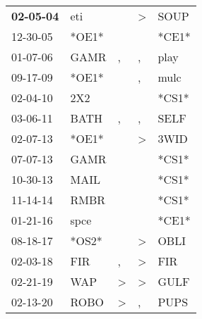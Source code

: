 \begin{supertabular}{p{0.07\textwidth}p{0.06\textwidth}p{0.02\textwidth}p{0.02\textwidth}p{0.06\textwidth}}
 \textbf{02-05-04\textsuperscript{}} &   eti\textsuperscript{} &               &  \textgreater &  SOUP\textsuperscript{} \\
          12-30-05\textsuperscript{} &                   *OE1* &               &               &                   *CE1* \\
          01-07-06\textsuperscript{} &  GAMR\textsuperscript{} &             , &             , &  play\textsuperscript{} \\
          09-17-09\textsuperscript{} &                   *OE1* &               &             , &  mulc\textsuperscript{} \\
          02-04-10\textsuperscript{} &   2X2\textsuperscript{} &               &               &                   *CS1* \\
          03-06-11\textsuperscript{} &  BATH\textsuperscript{} &             , &             , &  SELF\textsuperscript{} \\
          02-07-13\textsuperscript{} &                   *OE1* &               &  \textgreater &  3WID\textsuperscript{} \\
          07-07-13\textsuperscript{} &  GAMR\textsuperscript{} &               &               &                   *CS1* \\
          10-30-13\textsuperscript{} &  MAIL\textsuperscript{} &               &               &                   *CS1* \\
          11-14-14\textsuperscript{} &  RMBR\textsuperscript{} &               &               &                   *CS1* \\
          01-21-16\textsuperscript{} &  spce\textsuperscript{} &               &               &                   *CE1* \\
          08-18-17\textsuperscript{} &                   *OS2* &               &  \textgreater &  OBLI\textsuperscript{} \\
          02-03-18\textsuperscript{} &   FIR\textsuperscript{} &             , &  \textgreater &   FIR\textsuperscript{} \\
          02-21-19\textsuperscript{} &   WAP\textsuperscript{} &  \textgreater &  \textgreater &  GULF\textsuperscript{} \\
          02-13-20\textsuperscript{} &  ROBO\textsuperscript{} &  \textgreater &             , &  PUPS\textsuperscript{} \\
\end{supertabular}
